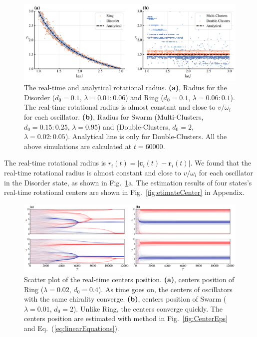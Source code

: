 \documentclass[%
 aip,
 amsmath,amssymb,
 reprint,%
]{revtex4-1}
\begin{document}
\begin{figure}
    \includegraphics[width=\textwidth]{./figs/radiusOmega.pdf}
    \caption{
        \label{fig:radiusOmega} The real-time and analytical rotational radius.
        \textbf{(a)}, Radius for the Disorder ($d_0=0.1$, $\lambda=0.01:0.06$) and Ring ($d_0=0.1$, $\lambda=0.06:0.1$). The real-time rotational radius is almost constant and close to $v/\omega_i$ for each oscillator. 
        \textbf{(b)}, Radius for Swarm (Multi-Clusters, $d_0=0.15:0.25$, $\lambda=0.95$) and (Double-Clusters, $d_0=2$, $\lambda=0.02:0.05$). Analytical line is only for Double-Clusters.
        All the above simulations are calculated at $t=60000$. 
    }
\end{figure}

The real-time rotational radius is $r_i(t)=\left| \mathbf{c}_i(t)-\mathbf{r}_i(t) \right|$. We found that the real-time rotational radius is almost constant and close to $v/\omega_i$ for each oscillator in the Disorder state, as shown in Fig.~\ref{fig:radiusOmega}a. The estimation results of four states's real-time rotational centers are shown in Fig.~\ref{fig:etimateCenter} in Appendix.

\begin{figure}
    \includegraphics[width=\textwidth]{./figs/centersPosition.png}
    \caption{
        \label{fig:centersPosition} Scatter plot of the real-time centers position. 
        \textbf{(a)}, centers position of Ring ($\lambda=0.02$, $d_0=0.4$). As time goes on, the centers of oscillators with the same chirality converge.
        \textbf{(b)}, centers position of Swarm ($\lambda=0.01$, $d_0=2$). Unlike Ring, the centers converge quickly.
        The centers position are estimated with method in Fig.~\ref{fig:CenterEps} and Eq.~(\ref{eq:linearEquations}).
    }
\end{figure}
\end{document}
